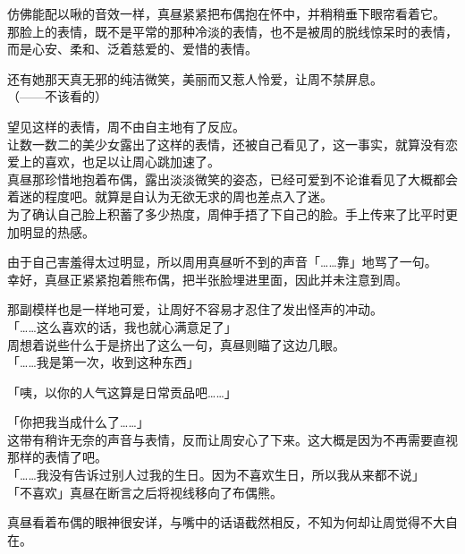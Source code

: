 仿佛能配以啾的音效一样，真昼紧紧把布偶抱在怀中，并稍稍垂下眼帘看着它。\\

那脸上的表情，既不是平常的那种冷淡的表情，也不是被周的脱线惊呆时的表情，而是心安、柔和、泛着慈爱的、爱惜的表情。

还有她那天真无邪的纯洁微笑，美丽而又惹人怜爱，让周不禁屏息。\\

（——不该看的）

望见这样的表情，周不由自主地有了反应。\\%

让数一数二的美少女露出了这样的表情，还被自己看见了，这一事实，就算没有恋爱上的喜欢，也足以让周心跳加速了。\\%

真昼那珍惜地抱着布偶，露出淡淡微笑的姿态，已经可爱到不论谁看见了大概都会着迷的程度吧。就算是自认为无欲无求的周也差点入了迷。\\

为了确认自己脸上积蓄了多少热度，周伸手捂了下自己的脸。手上传来了比平时更加明显的热感。

由于自己害羞得太过明显，所以周用真昼听不到的声音「……靠」地骂了一句。\\

幸好，真昼正紧紧抱着熊布偶，把半张脸埋进里面，因此并未注意到周。

那副模样也是一样地可爱，让周好不容易才忍住了发出怪声的冲动。\\

「……这么喜欢的话，我也就心满意足了」\\

周想着说些什么于是挤出了这么一句，真昼则瞄了这边几眼。\\

「……我是第一次，收到这种东西」

「咦，以你的人气这算是日常贡品吧……」

「你把我当成什么了……」\\

这带有稍许无奈的声音与表情，反而让周安心了下来。这大概是因为不再需要直视那样的表情了吧。\\

「……我没有告诉过别人过我的生日。因为不喜欢生日，所以我从来都不说」\\

「不喜欢」真昼在断言之后将视线移向了布偶熊。

真昼看着布偶的眼神很安详，与嘴中的话语截然相反，不知为何却让周觉得不大自在。\\


